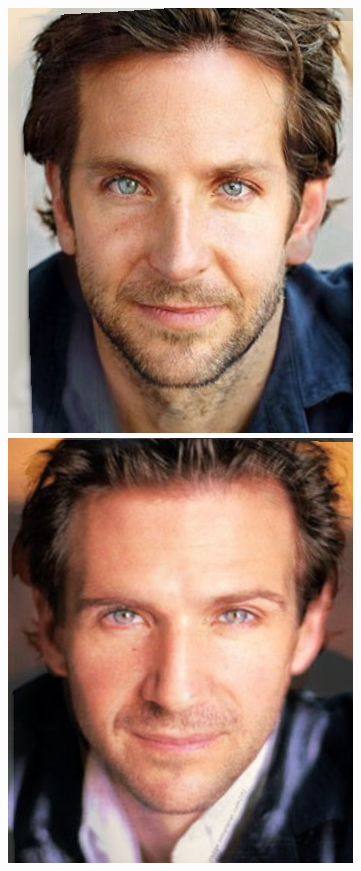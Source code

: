 \documentclass[conference]{IEEEtran}
\begin{document}
\begin{figure}[H]
\begin{multicols}{3}
    \includegraphics[width=1.0\linewidth]{results/faces/XL/img10.png} \par
    \includegraphics[width=1.0\linewidth]{results/faces/XL/img40.png} \par


\end{multicols}
\end{figure}
\end{document}

